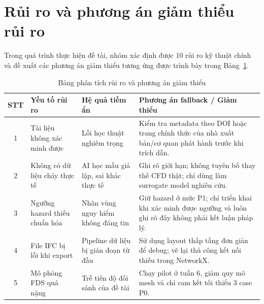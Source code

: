 \section{Rủi ro và phương án giảm thiểu rủi ro}
\label{sec:ruiro}

Trong quá trình thực hiện đề tài, nhóm xác định được 10 rủi ro kỹ thuật chính và đề xuất các phương án giảm thiểu tương ứng được trình bày trong Bảng~\ref{tab:ruiro}.

\begin{table}[htbp]
\centering
\caption{Bảng phân tích rủi ro và phương án giảm thiểu}
\label{tab:ruiro}
\footnotesize
\begin{tabularx}{\textwidth}{
  c
  >{\raggedright\arraybackslash}p{}
  >{\raggedright\arraybackslash}p{}
  >{\raggedright\arraybackslash}X}
\toprule
\textbf{STT} & \textbf{Yếu tố rủi ro} & \textbf{Hệ quả tiềm ẩn} & \textbf{Phương án fallback / Giảm thiểu} \\
\midrule
1 & Tài liệu không xác minh được & Lỗi học thuật nghiêm trọng & Kiểm tra metadata theo DOI hoặc trang chính thức của nhà xuất bản/cơ quan phát hành trước khi trích dẫn. \\
2 & Không có dữ liệu cháy thực tế & AI học mẫu giả lập, sai khác thực tế & Ghi rõ giới hạn; không tuyên bố thay thế CFD thật; chỉ dùng làm surrogate model nghiên cứu. \\
3 & Ngưỡng hazard thiếu chuẩn hóa & Nhãn vùng nguy hiểm không đáng tin & Giữ hazard ở mức P1; chỉ triển khai khi xác minh được ngưỡng và luôn ghi rõ đây không phải kết luận pháp lý. \\
4 & File IFC bị lỗi khi export & Pipeline dữ liệu bị gián đoạn từ đầu & Sử dụng layout thấp tầng đơn giản để debug; vẽ lại thủ công kết nối thiếu trong NetworkX. \\
5 & Mô phỏng FDS quá nặng & Trễ tiến độ đối sánh của đề tài & Chạy pilot ở tuần 6, giảm quy mô mesh và chỉ cam kết tối thiểu 3 case P0. \\
\bottomrule
\end{tabularx}
\end{table}

